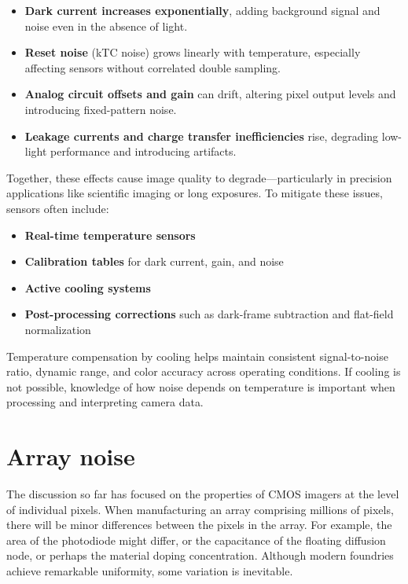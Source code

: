 \documentclass[
  letterpaper,
]{book}
\providecommand{\tightlist}{%
  \setlength{\itemsep}{0pt}\setlength{\parskip}{0pt}}\usepackage{longtable,booktabs,array}
\begin{document}
\begin{itemize}
\tightlist
\item
  \textbf{Dark current increases exponentially}, adding background
  signal and noise even in the absence of light.
\item
  \textbf{Reset noise} (kTC noise) grows linearly with temperature,
  especially affecting sensors without correlated double sampling.
\item
  \textbf{Analog circuit offsets and gain} can drift, altering pixel
  output levels and introducing fixed-pattern noise.
\item
  \textbf{Leakage currents and charge transfer inefficiencies} rise,
  degrading low-light performance and introducing artifacts.
\end{itemize}

Together, these effects cause image quality to degrade---particularly in
precision applications like scientific imaging or long exposures. To
mitigate these issues, sensors often include:

\begin{itemize}
\tightlist
\item
  \textbf{Real-time temperature sensors}
\item
  \textbf{Calibration tables} for dark current, gain, and noise
\item
  \textbf{Active cooling systems}
\item
  \textbf{Post-processing corrections} such as dark-frame subtraction
  and flat-field normalization
\end{itemize}

Temperature compensation by cooling helps maintain consistent
signal-to-noise ratio, dynamic range, and color accuracy across
operating conditions. If cooling is not possible, knowledge of how noise
depends on temperature is important when processing and interpreting
camera data.

\section{Array noise}\label{sec-array-noise}

The discussion so far has focused on the properties of CMOS imagers at
the level of individual pixels. When manufacturing an array comprising
millions of pixels, there will be minor differences between the pixels
in the array. For example, the area of the photodiode might differ, or
the capacitance of the floating diffusion node, or perhaps the material
doping concentration. Although modern foundries achieve remarkable
uniformity, some variation is inevitable.
\end{document}
